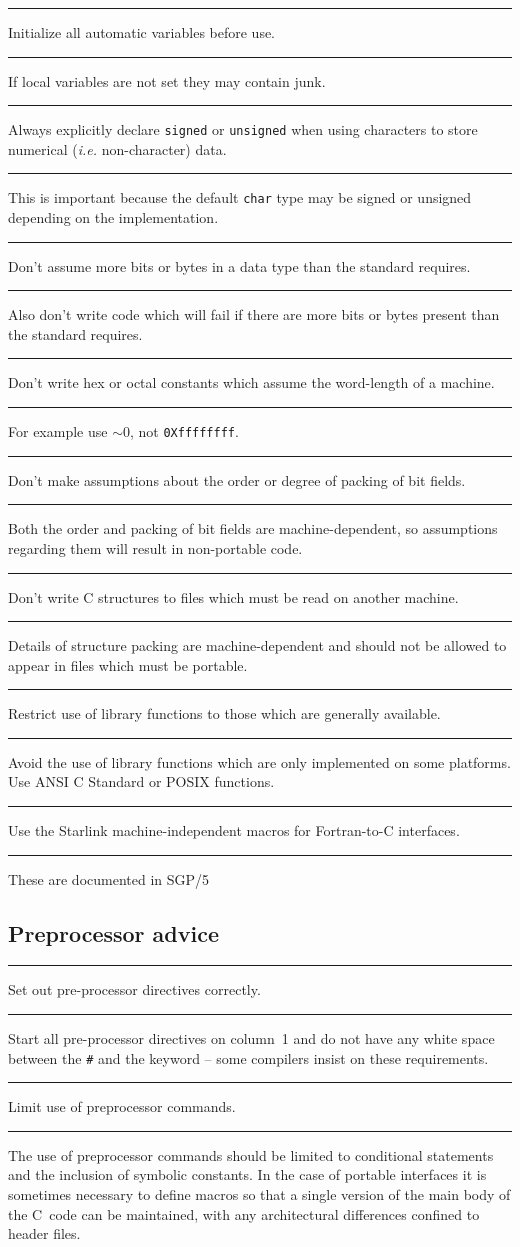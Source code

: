 \documentclass[twoside,11pt]{article}
\newcommand{\xref}[3]{#1}
\newcounter{sruleno}
\newcommand{\srule}[1]{
    \addtocounter{sruleno}{1}
    \goodbreak
    \rule[0.5ex]{\textwidth}{0.3mm}
    {\Large #1 \hfill {\thesruleno}}
    \rule[0.5ex]{\textwidth}{0.1mm}
}
\newcommand{\srule}[1]{
       \addtocounter{sruleno}{1}
       \begin{rawhtml} <HR> \end{rawhtml}
       {\Large \thesruleno}~~~~{\Large #1}
       \begin{rawhtml} <HR> \end{rawhtml}
       \end{tabular}
  }
\begin{document}
\srule{Initialize all automatic variables before use.}
If local variables are not set they may contain junk.

\srule{Always explicitly declare {\tt signed} or {\tt unsigned} when using 
characters to store  numerical ({\sl i.e.} non-character) data.}
This is important because 
the default {\tt char} type may be signed 
or unsigned depending on the implementation.


\srule{Don't assume more bits or bytes in a data type than the standard
 requires.}
Also don't write code which will fail if there are more bits or bytes present 
than the standard requires.


\srule{Don't write hex or octal constants which assume the word-length of a 
machine.}
For example use {\tt$\sim0$}, not {\tt 0Xffffffff}.


\srule{Don't make assumptions about the order or degree of packing of 
bit fields.}
Both the order and packing of bit fields are machine-dependent, so 
assumptions regarding them will result in non-portable code.

\srule{Don't write C structures to files which must be read on another 
machine.}
Details of structure packing are machine-dependent and should not be allowed 
to appear in files which must be portable.

\srule{Restrict use of library functions to those which are
generally available.}
Avoid the use of library functions which are only implemented 
on some platforms. Use ANSI C Standard or POSIX functions.

\srule{Use the Starlink machine-independent macros for Fortran-to-C 
interfaces.}
These are documented in \xref{SGP/5}{sgp5}.

\subsection{Preprocessor advice}


\srule{Set out pre-processor directives correctly.}
Start all pre-processor directives on column~1 and do not have any white
space between the {\tt \#} and the keyword -- some compilers insist on 
these requirements.

\srule{Limit use of preprocessor commands.}
The use of preprocessor commands should be limited to conditional 
statements and the inclusion of symbolic constants.
In the case of portable interfaces it is sometimes necessary to define
macros so that a single version of the main body of the C~code can be 
maintained,
with any architectural differences confined to header files.
\end{document}
